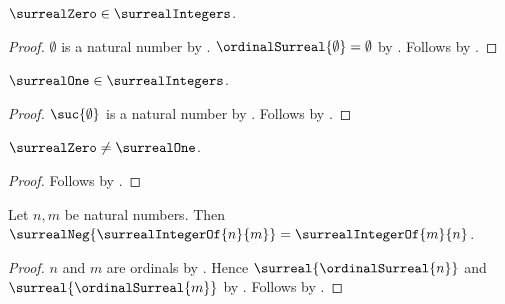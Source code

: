 \begin{proposition}\label{surreal_integer_zero}
    $\surrealZero\in\surrealIntegers$.
\end{proposition}
\begin{proof}
    $\emptyset$ is a natural number by .
    $\ordinalSurreal{\emptyset}=\emptyset$
        by .
    Follows by .
\end{proof}

\begin{proposition}\label{surreal_integer_one}
    $\surrealOne\in\surrealIntegers$.
\end{proposition}
\begin{proof}
    $\suc{\emptyset}$ is a natural number
        by .
    Follows by .
\end{proof}

\begin{proposition}\label{surreal_integer_zero_neq_one}
    $\surrealZero\neq\surrealOne$.
\end{proposition}
\begin{proof}
    Follows by
        .
\end{proof}

\begin{theorem}\label{surreal_integer_of_negation}
    Let $n,m$ be natural numbers.
    Then $\surrealNeg{\surrealIntegerOf{n}{m}}
        =\surrealIntegerOf{m}{n}$.
\end{theorem}
\begin{proof}
    $n$ and $m$ are ordinals by .
    Hence $\surreal{\ordinalSurreal{n}}$ and
        $\surreal{\ordinalSurreal{m}}$
        by .
    Follows by
        .
\end{proof}


